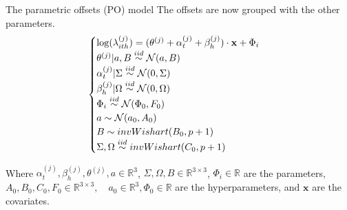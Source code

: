 \documentclass{beamer}
\begin{document}
\begin{frame}{The parametric offsets (PO) model}
The offsets are now grouped with the other parameters.
\begin{equation}
\begin{cases}
\log(\lambda^{(j)}_{ith}) = (\boldmath{\theta^{(j)} +  \alpha^{(j)}_{t} + \beta_{h}^{(j)})}\cdot\mathbf{x} + \Phi_i\\
\theta^{(j)}|a,B \stackrel{iid}{\sim} \mathcal{N}(a,B)\\
\alpha_{t}^{(j)}|\Sigma \stackrel{iid}{\sim} \mathcal{N}(0, \Sigma)\\
\beta_{h}^{(j)}|\Omega \stackrel{iid}{\sim} \mathcal{N}(0, \Omega)\\
\Phi_i \stackrel{iid}{\sim} \mathcal{N}(\Phi_0, F_0)\\
a \sim \mathcal{N}(a_0, A_0)\\
B \sim invWishart(B_0, p+1)\\
\Sigma, \Omega \stackrel{iid}{\sim} invWishart(C_0, p+1)

\end{cases}
\end{equation}

Where $\alpha_{t}^{(j)}, \beta_{h}^{(j)}, \theta^{(j)}, a \in \mathbb{R}^3$, $\Sigma, \Omega, B \in \mathbb{R}^{3\times 3}$, $\Phi_i \in \mathbb{R}$ are the parameters, $A_0, B_0, C_0, F_0 \in \mathbb{R}^{3\times 3},\quad a_0 \in \mathbb{R}^3, \Phi_0 \in \mathbb{R}$ are the hyperparameters, and $\mathbf{x}$ are the covariates.
\end{frame}
\end{document}
